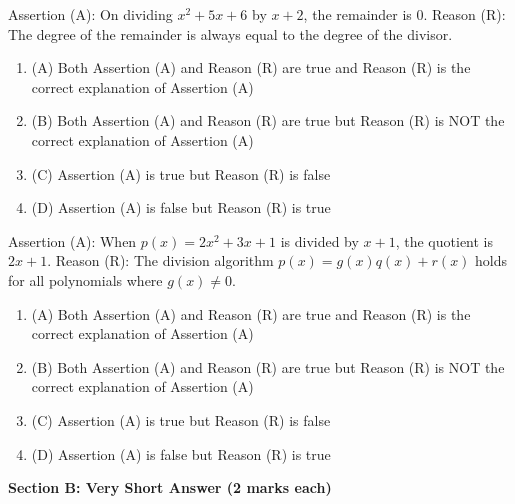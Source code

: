 \documentclass[12pt,a4paper]{exam}
\begin{document}
\begin{questions}
\question[1] Assertion (A): On dividing $x^2 + 5x + 6$ by $x + 2$, the remainder is 0. Reason (R): The degree of the remainder is always equal to the degree of the divisor.
\begin{enumerate}[label=(\Alph*)]
  \item (A) Both Assertion (A) and Reason (R) are true and Reason (R) is the correct explanation of Assertion (A)
  \item (B) Both Assertion (A) and Reason (R) are true but Reason (R) is NOT the correct explanation of Assertion (A)
  \item (C) Assertion (A) is true but Reason (R) is false
  \item (D) Assertion (A) is false but Reason (R) is true
\end{enumerate}
\vspace{0.15cm}

\question[1] Assertion (A): When $p(x) = 2x^2 + 3x + 1$ is divided by $x+1$, the quotient is $2x+1$. Reason (R): The division algorithm $p(x) = g(x)q(x) + r(x)$ holds for all polynomials where $g(x) \neq 0$.
\begin{enumerate}[label=(\Alph*)]
  \item (A) Both Assertion (A) and Reason (R) are true and Reason (R) is the correct explanation of Assertion (A)
  \item (B) Both Assertion (A) and Reason (R) are true but Reason (R) is NOT the correct explanation of Assertion (A)
  \item (C) Assertion (A) is true but Reason (R) is false
  \item (D) Assertion (A) is false but Reason (R) is true
\end{enumerate}
\vspace{0.15cm}

\end{questions}
\bigskip
\noindent\textbf{\large Section B: Very Short Answer (2 marks each)}
\end{document}
